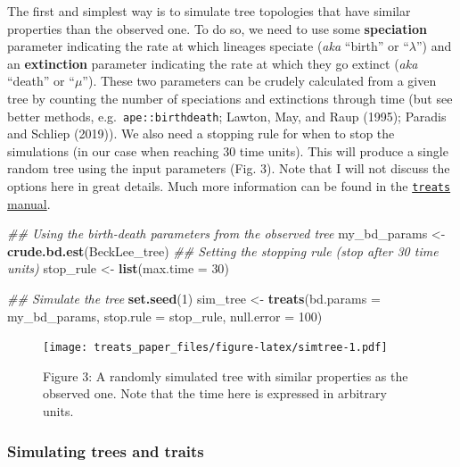 \documentclass[
]{article}
\newenvironment{Shaded}{\begin{snugshade}}{\end{snugshade}}
\newcommand{\CommentTok}[1]{\textcolor[rgb]{0.56,0.35,0.01}{\textit{#1}}}
\newcommand{\DataTypeTok}[1]{\textcolor[rgb]{0.13,0.29,0.53}{#1}}
\newcommand{\DecValTok}[1]{\textcolor[rgb]{0.00,0.00,0.81}{#1}}
\newcommand{\KeywordTok}[1]{\textcolor[rgb]{0.13,0.29,0.53}{\textbf{#1}}}
\newcommand{\NormalTok}[1]{#1}
\newcommand{\StringTok}[1]{\textcolor[rgb]{0.31,0.60,0.02}{#1}}
\begin{document}
The first and simplest way is to simulate tree topologies that have
similar properties than the observed one. To do so, we need to use some
\textbf{speciation} parameter indicating the rate at which lineages
speciate (\emph{aka} ``birth'' or ``\(\lambda\)'') and an
\textbf{extinction} parameter indicating the rate at which they go
extinct (\emph{aka} ``death'' or ``\(\mu\)''). These two parameters can
be crudely calculated from a given tree by counting the number of
speciations and extinctions through time (but see better methods,
e.g.~\texttt{ape::birthdeath}; Lawton, May, and Raup (1995); Paradis and
Schliep (2019)). We also need a stopping rule for when to stop the
simulations (in our case when reaching 30 time units). This will produce
a single random tree using the input parameters (Fig. 3). Note that I
will not discuss the options here in great details. Much more
information can be found in the
\href{http://tguillerme.github.io/treats.html}{\texttt{treats} manual}.

\begin{Shaded}
\begin{Highlighting}[]
\CommentTok{\#\# Using the birth{-}death parameters from the observed tree}
\NormalTok{my\_bd\_params \textless{}{-}}\StringTok{ }\KeywordTok{crude.bd.est}\NormalTok{(BeckLee\_tree)}
\CommentTok{\#\# Setting the stopping rule (stop after 30 time units)}
\NormalTok{stop\_rule \textless{}{-}}\StringTok{ }\KeywordTok{list}\NormalTok{(}\DataTypeTok{max.time =} \DecValTok{30}\NormalTok{)}

\CommentTok{\#\# Simulate the tree}
\KeywordTok{set.seed}\NormalTok{(}\DecValTok{1}\NormalTok{)}
\NormalTok{sim\_tree \textless{}{-}}\StringTok{ }\KeywordTok{treats}\NormalTok{(}\DataTypeTok{bd.params  =}\NormalTok{ my\_bd\_params,}
                   \DataTypeTok{stop.rule  =}\NormalTok{ stop\_rule,}
                   \DataTypeTok{null.error =} \DecValTok{100}\NormalTok{)}
\end{Highlighting}
\end{Shaded}

\begin{figure}
\centering
\texttt{[image: treats\_paper\_files/figure-latex/simtree-1.pdf]}
\caption{Figure 3: A randomly simulated tree with similar properties as
the observed one. Note that the time here is expressed in arbitrary
units.}
\end{figure}

\hypertarget{simulating-trees-and-traits}{%
\subsubsection{Simulating trees and
traits}\label{simulating-trees-and-traits}}
\end{document}
